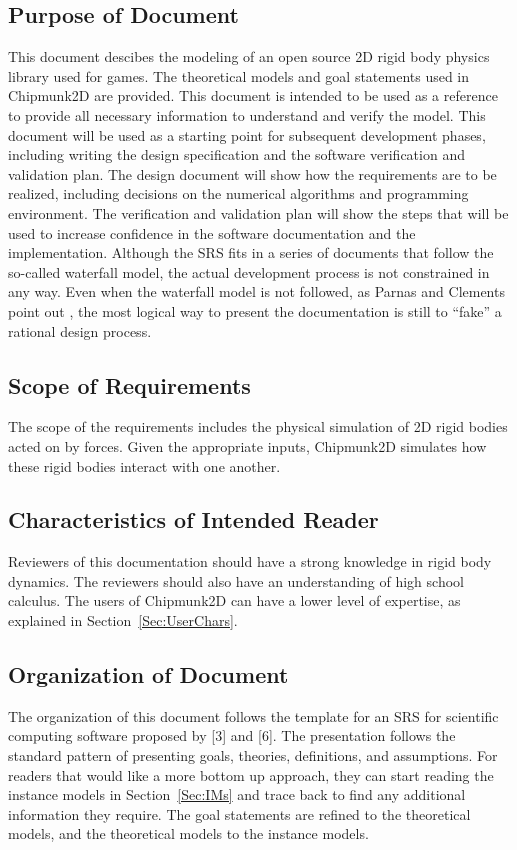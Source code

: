 \documentclass[12pt]{article}
\begin{document}
\subsection{Purpose of Document}
\label{Sec:DocPurpose}
This document descibes the modeling of an open source 2D rigid body physics library used for games. The theoretical models and goal statements used in Chipmunk2D are provided. This document is intended to be used as a reference to provide all necessary information to understand and verify the model.
This document will be used as a starting point for subsequent development phases, including writing the design specification and the software verification and validation plan. The design document will show how the requirements are to be realized, including decisions on the numerical algorithms and programming environment. The verification and validation plan will show the steps that will be used to increase confidence in the software documentation and the implementation. Although the SRS fits in a series of documents that follow the so-called waterfall model, the actual development process is not constrained in any way. Even when the waterfall model is not followed, as Parnas and Clements point out \cite{parnasClements1986}, the most logical way to present the documentation is still to ``fake'' a rational design process.
\subsection{Scope of Requirements}
\label{Sec:ReqsScope}
The scope of the requirements includes the physical simulation of 2D rigid bodies acted on by forces. Given the appropriate inputs, Chipmunk2D simulates how these rigid bodies interact with one another.
\subsection{Characteristics of Intended Reader}
\label{Sec:ReaderChars}
Reviewers of this documentation should have a strong knowledge in rigid body dynamics. The reviewers should also have an understanding of high school calculus. The users of Chipmunk2D can have a lower level of expertise, as explained in Section~\ref{Sec:UserChars}.
\subsection{Organization of Document}
\label{Sec:DocOrg}
The organization of this document follows the template for an SRS for scientific computing software proposed by {[}3{]} and {[}6{]}. The presentation follows the standard pattern of presenting goals, theories, definitions, and assumptions. For readers that would like a more bottom up approach, they can start reading the instance models in Section~\ref{Sec:IMs} and trace back to find any additional information they require.
The goal statements are refined to the theoretical models, and the theoretical models to the instance models.
\end{document}
